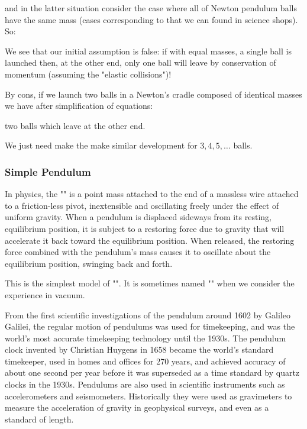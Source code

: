 	and in the latter situation consider the case where all of Newton pendulum balls have the same mass (cases corresponding to that we can found in science shops). So:
	
	We see that our initial assumption is false: if with equal masses, a single ball is launched then, at the other end, only one ball will leave by conservation of momentum (assuming the "elastic collisions")!

	By cons, if we launch two balls in a Newton's cradle composed of identical masses we have after simplification of equations:
	
	two balls which leave at the other end.

	We just need make the make similar development for $3, 4, 5, \ldots$ balls.
	
	\subsubsection{Simple Pendulum}
	In physics, the "" is a point mass attached to the end of a massless wire attached to a friction-less pivot, inextensible and oscillating freely under the effect of uniform gravity. When a pendulum is displaced sideways from its resting, equilibrium position, it is subject to a restoring force due to gravity that will accelerate it back toward the equilibrium position. When released, the restoring force combined with the pendulum's mass causes it to oscillate about the equilibrium position, swinging back and forth. 
	
	This is the simplest model of "". It is sometimes named "" when we consider the experience in vacuum.
	
	\begin{tcolorbox}[title=Remark,colframe=black,arc=10pt]
	From the first scientific investigations of the pendulum around 1602 by Galileo Galilei, the regular motion of pendulums was used for timekeeping, and was the world's most accurate timekeeping technology until the 1930s. The pendulum clock invented by Christian Huygens in 1658 became the world's standard timekeeper, used in homes and offices for 270 years, and achieved accuracy of about one second per year before it was superseded as a time standard by quartz clocks in the 1930s. Pendulums are also used in scientific instruments such as accelerometers and seismometers. Historically they were used as gravimeters to measure the acceleration of gravity in geophysical surveys, and even as a standard of length.
	\end{tcolorbox}

